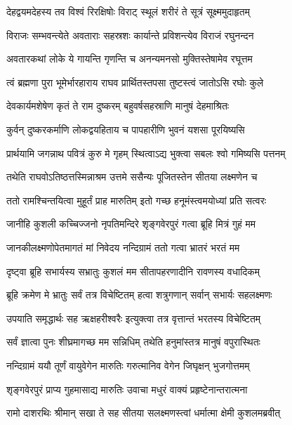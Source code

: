\twolineshloka
{देहद्वयमदेहस्य तव विश्वं रिरक्षिषोः}
{विराट् स्थूलं शरीरं ते सूत्रं सूक्ष्ममुदाहृतम्} %

\twolineshloka
{विराजः सम्भवन्त्येते अवताराः सहस्रशः}
{कार्यान्ते प्रविशन्त्येव विराजं रघुनन्दन} %

\twolineshloka
{अवतारकथां लोके ये गायन्ति गृणन्ति च}
{अनन्यमनसो मुक्तिस्तेषामेव रघूत्तम} %

\twolineshloka
{त्वं ब्रह्मणा पुरा भूमेर्भारहाराय राघव}
{प्रार्थितस्तपसा तुष्टस्त्वं जातोऽसि रघोः कुले} %

\twolineshloka
{देवकार्यमशेषेण कृतं ते राम दुष्करम्}
{बहुवर्षसहस्राणि मानुषं देहमाश्रितः} %

\twolineshloka
{कुर्वन् दुष्करकर्माणि लोकद्वयहिताय च}
{पापहारीणि भुवनं यशसा पूरयिष्यसि} %

\twolineshloka
{प्रार्थयामि जगन्नाथ पवित्रं कुरु मे गृहम्}
{स्थित्वाऽद्य भुक्त्वा सबलः श्वो गमिष्यसि पत्तनम्} %

\twolineshloka
{तथेति राघवोऽतिष्ठत्तस्मिन्नाश्रम उत्तमे}
{ससैन्यः पूजितस्तेन सीतया लक्ष्मणेन च} %

\twolineshloka
{ततो रामश्चिन्तयित्वा मुहूर्तं प्राह मारुतिम्}
{इतो गच्छ हनूमंस्त्वमयोध्यां प्रति सत्वरः} %

\twolineshloka
{जानीहि कुशली कच्चिज्जनो नृपतिमन्दिरे}
{शृङ्गवेरपुरं गत्वा ब्रूहि मित्रं गुहं मम} %

\twolineshloka
{जानकीलक्ष्मणोपेतमागतं मां निवेदय}
{नन्दिग्रामं ततो गत्वा भ्रातरं भरतं मम} %

\twolineshloka
{दृष्ट्वा ब्रूहि सभार्यस्य सभ्रातुः कुशलं मम}
{सीतापहरणादीनि रावणस्य वधादिकम्} %

\twolineshloka
{ब्रूहि क्रमेण मे भ्रातुः सर्वं तत्र विचेष्टितम्}
{हत्वा शत्रुगणान् सर्वान् सभार्यः सहलक्ष्मणः} %

\twolineshloka
{उपयाति समृद्धार्थः सह ऋक्षहरीश्वरैः}
{इत्युक्त्वा तत्र वृत्तान्तं भरतस्य विचेष्टितम्} %

\twolineshloka
{सर्वं ज्ञात्वा पुनः शीघ्रमागच्छ मम सन्निधिम्}
{तथेति हनुमांस्तत्र मानुषं वपुरास्थितः} %

\twolineshloka
{नन्दिग्रामं ययौ तूर्णं वायुवेगेन मारुतिः}
{गरुत्मानिव वेगेन जिघृक्षन् भुजगोत्तमम्} %

\twolineshloka
{शृङ्गवेरपुरं प्राप्य गुहमासाद्य मारुतिः}
{उवाचा मधुरं वाक्यं प्रहृष्टेनान्तरात्मना} %

\twolineshloka
{रामो दाशरथिः श्रीमान् सखा ते सह सीतया}
{सलक्ष्मणस्त्वां धर्मात्मा क्षेमी कुशलमब्रवीत्} %

